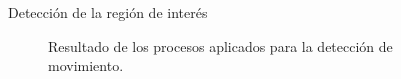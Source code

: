\begin{frame}{Detección de la región de interés}
\begin{figure}[tbhp]
    \caption[\small{Detección de movimiento}]{\small{Resultado de los procesos aplicados para la detección de movimiento.}}
    \label{fig:deteccion_movimiento}               %
  \end{figure}
\end{frame}


